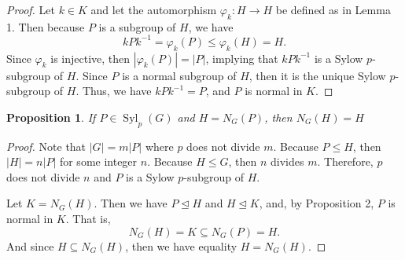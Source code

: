 \documentclass[12pt]{article}
\newtheorem{proposition}{Proposition}
\renewcommand{\phi}{\varphi}
\newcommand{\teq}{\trianglelefteq}
\newcommand{\Syl}{\operatorname{Syl}}
\newcommand{\<}{\left\langle}
\renewcommand{\>}{\right\rangle}
\begin{document}
\begin{proof}
    Let $k \in K$ and let the automorphism $\phi_k : H \to H$ be defined as in Lemma 1. Then because $P$ is a subgroup of $H$, we have
    \[
        kPk^{-1} = \phi_k(P) \leq \phi_k(H) = H.
    \]
    Since $\phi_k$ is injective, then $|\phi_k(P)| = |P|$, implying that $kPk^{-1}$ is a Sylow $p$-subgroup of $H$. Since $P$ is a normal subgroup of $H$, then it is the unique Sylow $p$-subgroup of $H$. Thus, we have $kPk^{-1} = P$, and $P$ is normal in $K$.
    
\end{proof}

\begin{proposition}
    If $P \in \Syl_p(G)$ and $H = N_G(P)$, then $N_G(H) = H$
\end{proposition}

\begin{proof}
    Note that $|G| = m|P|$ where $p$ does not divide $m$. Because $P \leq H$, then $|H| = n|P|$ for some integer $n$. Because $H \leq G$, then $n$ divides $m$. Therefore, $p$ does not divide $n$ and $P$ is a Sylow $p$-subgroup of $H$.
    
    Let $K = N_G(H)$. Then we have $P \teq H$ and $H \teq K$, and, by Proposition 2, $P$ is normal in $K$. That is,
    \[
        N_G(H) = K \subseteq N_G(P) = H.
    \]
    And since $H \subseteq N_G(H)$, then we have equality $H = N_G(H)$.
    
\end{proof}
\end{document}
